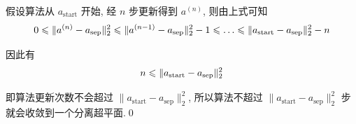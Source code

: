 \documentclass{article}
\begin{document}
假设算法从 $a_{\mathrm{start}}$ 开始, 经 $n$ 步更新得到 $a^{(n)}$, 则由上式可知
\begin{equation}
  0\ls\|a^{(n)}-a_{\mathrm{sep}}\|_2^2\ls\|a^{(n-1)}-a_{\mathrm{sep}}\|_2^2-1\ls\dots\ls\|a_{\mathrm{start}}-a_{\mathrm{sep}}\|_2^2-n
\end{equation}

因此有
\begin{equation}
  n\leqslant\|a_{\mathrm{start}}-a_{\mathrm{sep}}\|_2^2
\end{equation}

即算法更新次数不会超过 $\|a_{\mathrm{start}}-a_{\mathrm{sep}}\|_2^2$, 所以算法不超过 $\|a_{\mathrm{start}}-a_{\mathrm{sep}}\|_2^2$ 步就会收敛到一个分离超平面.\qed

\end{document}
